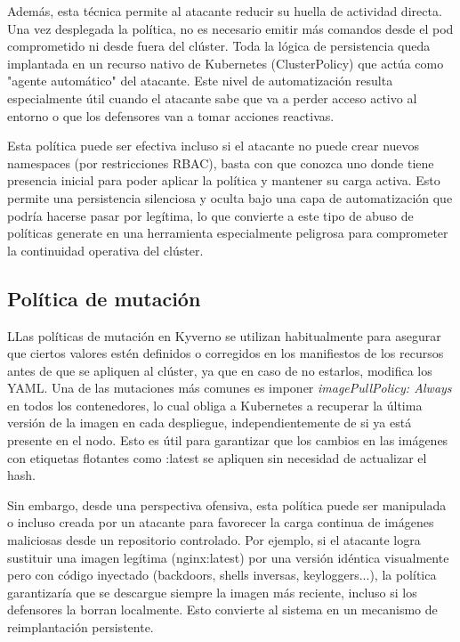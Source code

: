 \documentclass[12pt,twoside,titlepage]{report}
\begin{document}
Además, esta técnica permite al atacante reducir su huella de actividad directa. Una vez desplegada la política, no es necesario emitir más comandos desde el pod comprometido ni desde fuera del clúster. Toda la lógica de persistencia queda implantada en un recurso nativo de Kubernetes (ClusterPolicy) que actúa como "agente automático" del atacante. Este nivel de automatización resulta especialmente útil cuando el atacante sabe que va a perder acceso activo al entorno o que los defensores van a tomar acciones reactivas.

Esta política puede ser efectiva incluso si el atacante no puede crear nuevos namespaces (por restricciones RBAC), basta con que conozca uno donde tiene presencia inicial para poder aplicar la política y mantener su carga activa. Esto permite una persistencia silenciosa  y oculta bajo una capa de automatización que podría hacerse pasar por legítima, lo que convierte a este tipo de abuso de políticas generate en una herramienta especialmente peligrosa para comprometer la continuidad operativa del clúster.


\subsection{Política de mutación}
LLas políticas de mutación en Kyverno se utilizan habitualmente para asegurar que ciertos valores estén definidos o corregidos en los manifiestos de los recursos antes de que se apliquen al clúster, ya que en caso de no estarlos, modifica los YAML. Una de las mutaciones más comunes es imponer \textit{imagePullPolicy: Always} en todos los contenedores, lo cual obliga a Kubernetes a recuperar la última versión de la imagen en cada despliegue, independientemente de si ya está presente en el nodo. Esto es útil para garantizar que los cambios en las imágenes con etiquetas flotantes como :latest se apliquen sin necesidad de actualizar el hash.

Sin embargo, desde una perspectiva ofensiva, esta política puede ser manipulada o incluso creada por un atacante para favorecer la carga continua de imágenes maliciosas desde un repositorio controlado. Por ejemplo, si el atacante logra sustituir una imagen legítima (nginx:latest) por una versión idéntica visualmente pero con código inyectado (backdoors, shells inversas, keyloggers...), la política garantizaría que se descargue siempre la imagen más reciente, incluso si los defensores la borran localmente. Esto convierte al sistema en un mecanismo de reimplantación persistente.
\end{document}
